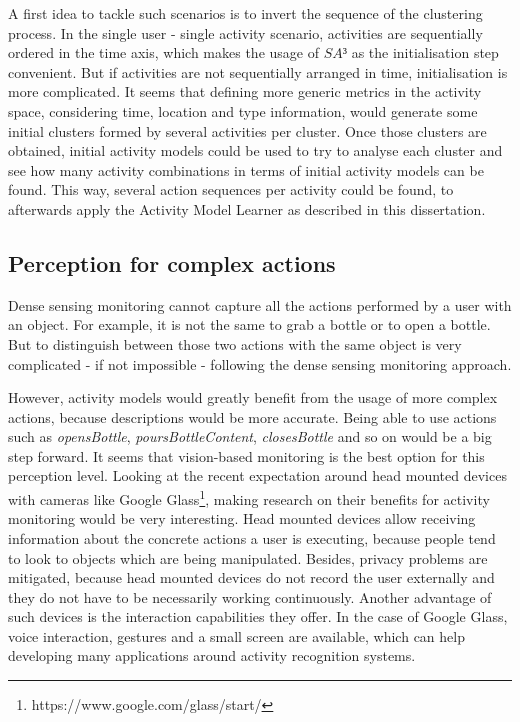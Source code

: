 A first idea to tackle such scenarios is to invert the sequence of the clustering process. In the single user - single activity scenario, activities are sequentially ordered in the time axis, which makes the usage of $SA³$ as the initialisation step convenient. But if activities are not sequentially arranged in time, initialisation is more complicated. It seems that defining more generic metrics in the activity space, considering time, location and type information, would generate some initial clusters formed by several activities per cluster. Once those clusters are obtained, initial activity models could be used to try to analyse each cluster and see how many activity combinations in terms of initial activity models can be found. This way, several action sequences per activity could be found, to afterwards apply the Activity Model Learner as described in this dissertation.

\subsection{Perception for complex actions}

Dense sensing monitoring cannot capture all the actions performed by a user with an object. For example, it is not the same to grab a bottle or to open a bottle. But to distinguish between those two actions with the same object is very complicated - if not impossible - following the dense sensing monitoring approach.

However, activity models would greatly benefit from the usage of more complex actions, because descriptions would be more accurate. Being able to use actions such as \textit{opensBottle}, \textit{poursBottleContent}, \textit{closesBottle} and so on would be a big step forward. It seems that vision-based monitoring is the best option for this perception level. Looking at the recent expectation around head mounted devices with cameras like Google Glass\footnote{https://www.google.com/glass/start/}, making research on their benefits for activity monitoring would be very interesting. Head mounted devices allow receiving information about the concrete actions a user is executing, because people tend to look to objects which are being manipulated. Besides, privacy problems are mitigated, because head mounted devices do not record the user externally and they do not have to be necessarily working continuously. Another advantage of such devices is the interaction capabilities they offer. In the case of Google Glass, voice interaction, gestures and a small screen are available, which can help developing many applications around activity recognition systems.

